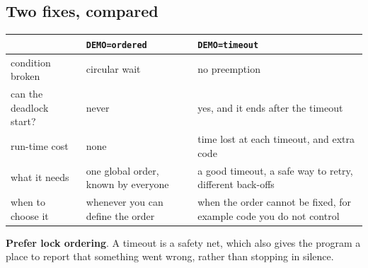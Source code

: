 \subsection{Two fixes, compared}
\begin{center}
\small
\begin{tabular}{P{0.2} P{0.32} P{0.36}}
    \hline
    & \texttt{DEMO=ordered} & \texttt{DEMO=timeout} \\
    \hline
    condition broken & circular wait & no preemption \\
    can the deadlock start? & never & yes, and it ends after the timeout \\
    run-time cost & none & time lost at each timeout, and extra code \\
    what it needs & one global order, known by everyone & a good timeout, a safe way to retry, different back-offs \\
    when to choose it & whenever you can define the order & when the order cannot be fixed, for example code you do not control \\
    \hline
\end{tabular}
\end{center}
\textbf{Prefer lock ordering}. A timeout is a safety net, which also gives the program a place to report that something went wrong, rather than stopping in silence.

